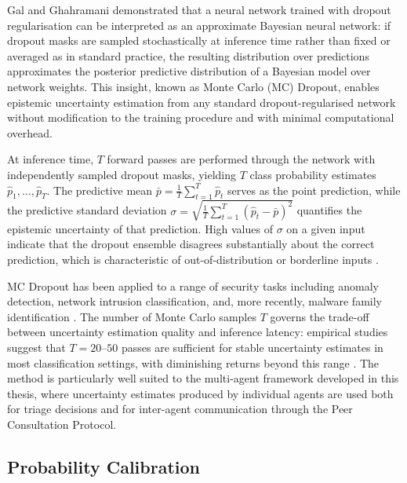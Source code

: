 Gal and Ghahramani \cite{gal2016dropout} demonstrated that a neural network trained with
dropout regularisation can be interpreted as an approximate Bayesian neural network: if
dropout masks are sampled stochastically at inference time rather than fixed or averaged as
in standard practice, the resulting distribution over predictions approximates the posterior
predictive distribution of a Bayesian model over network weights.
This insight, known as Monte Carlo (MC) Dropout, enables epistemic uncertainty estimation
from any standard dropout-regularised network without modification to the training procedure
and with minimal computational overhead.

At inference time, $T$ forward passes are performed through the network with independently
sampled dropout masks, yielding $T$ class probability estimates $\hat{p}_1, \ldots, \hat{p}_T$.
The predictive mean $\bar{p} = \frac{1}{T}\sum_{t=1}^{T}\hat{p}_t$ serves as the point
prediction, while the predictive standard deviation
$\sigma = \sqrt{\frac{1}{T}\sum_{t=1}^{T}(\hat{p}_t - \bar{p})^2}$ quantifies the
epistemic uncertainty of that prediction.
High values of $\sigma$ on a given input indicate that the dropout ensemble disagrees
substantially about the correct prediction, which is characteristic of out-of-distribution
or borderline inputs \cite{gal2016dropout, gawlikowski2023Uncertainity}.

MC Dropout has been applied to a range of security tasks including anomaly detection,
network intrusion classification, and, more recently, malware
family identification \cite{Doan2024uncertainBay}.
The number of Monte Carlo samples $T$ governs the trade-off between uncertainty estimation
quality and inference latency: empirical studies suggest that $T = 20$--$50$ passes are
sufficient for stable uncertainty estimates in most classification settings, with diminishing
returns beyond this range \cite{gal2016dropout}.
The method is particularly well suited to the multi-agent framework developed in this thesis,
where uncertainty estimates produced by individual agents are used both for triage decisions
and for inter-agent communication through the Peer Consultation Protocol.

\subsection{Probability Calibration}
\label{sec:lit_calibration}

